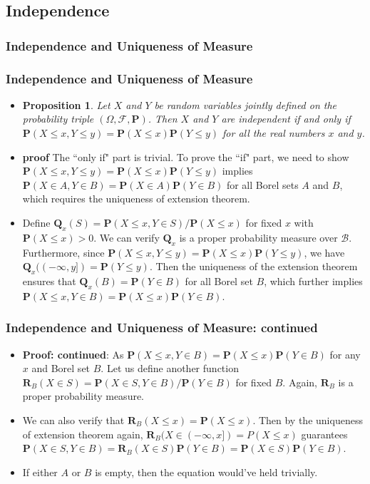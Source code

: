 \documentclass[handout]{beamer}
\newtheorem{Proposition}[theorem]{Proposition}%
\newcommand{\BP}{\mathbf{P}}
\begin{document}
\subsection{Independence}


\subsubsection{Independence and Uniqueness of Measure}
\frame
{
  \frametitle{Independence and Uniqueness of Measure}

   \begin{itemize}

\item<1->[]  
\begin{Proposition}
Let $X$ and $Y$ be random variables jointly defined on the probability triple $(\Omega, \mathcal{F}, \BP)$. Then $X$ and $Y$ are independent if and only if $\BP(X\leq x, Y\leq y)=\BP(X\leq x)\BP (Y\leq y)$ for all the real numbers $x$ and $y$.
\end{Proposition}
             
\item<2->  
\textbf{proof} The ``only if" part is trivial. To prove the ``if" part, we need to show $\BP(X\leq x, Y\leq y)=\BP(X\leq x)\BP (Y\leq y)$ implies $\BP(X\in A, Y\in B)=\BP(X\in A)\BP (Y\in B)$ for all Borel sets $A$ and $B$, which requires the uniqueness of extension theorem. 

\item<3->[-] 
Define $\mathbf{Q}_x(S)=\BP(X\leq x, Y\in S)/\BP(X\leq x)$ for fixed $x$ with $\BP(X\leq x)>0$. We can verify $\mathbf{Q}_x$ is a proper probability measure over $\mathcal{B}$. Furthermore, since $\BP(X\leq x, Y\leq y)=\BP(X\leq x)\BP (Y\leq y)$, we have $\mathbf{Q}_x((-\infty, y])=\mathbf{P}(Y\leq y)$. Then the uniqueness of the extension theorem ensures that $\mathbf{Q}_x(B)=\BP(Y\in B)$ for all Borel set $B$, which further implies $\BP(X\leq x, Y\in B)=\BP(X\leq x)\BP( Y\in B)$. 
                           
\end{itemize}
}


\frame
{
  \frametitle{Independence and Uniqueness of Measure: continued}

   \begin{itemize}

\item<1->  
\textbf{Proof: continued}: As  $\BP(X\leq x, Y\in B)=\BP(X\leq x)\BP( Y\in B)$ for any $x$ and Borel set $B$. Let us define another function $\mathbf{R}_B (X\in S)=\BP(X\in S, Y\in B)/\BP(Y\in B)$ for fixed $B$. Again, $\mathbf{R}_B$ is a proper probability measure. 

\item<2->  We can also verify that $\mathbf{R}_B (X\leq x)=\BP(X\leq x)$. Then by the uniqueness of extension theorem again, $\mathbf{R}_B(X \in (-\infty,x]) = P(X \le x)$ guarantees $\BP(X\in S, Y\in B)=\mathbf{R}_B (X\in S)\BP(Y\in B)=\BP(X\in S)\BP(Y\in B)$.


\item<3-> If either $A$ or $B$ is empty, then the equation would've held trivially.

\end{itemize}
}
\end{document}
